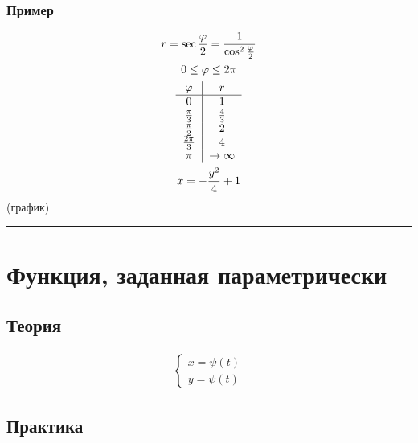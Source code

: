 \documentclass{article}
\begin{document}
\subsubsection{Пример}
\begin{gather*}
    r = \sec \frac{\varphi}{2} = \frac{1}{\cos^2 \frac{\varphi}{2}} \\
    0 \le \varphi \le 2\pi \\
    \begin{tabular}{c|c}
        $\varphi$        & $r$           \\
        \hline
        $0$              & $1$           \\
        $\frac{\pi}{3}$  & $\frac{4}{3}$ \\
        $\frac{\pi}{2}$  & $2$           \\
        $\frac{2\pi}{3}$ & $4$           \\
        $\pi$            & $\to \infty$
    \end{tabular} \\
    x = -\frac{y^2}{4} + 1
\end{gather*}
(график)



\par\noindent\rule{\textwidth}{1pt}
\section{Функция, заданная параметрически}

\subsection{Теория}
\begin{gather*}
    \begin{cases}
        x = \psi(t) \\
        y = \psi(t)
    \end{cases}
\end{gather*}


\subsection{Практика}
\end{document}
